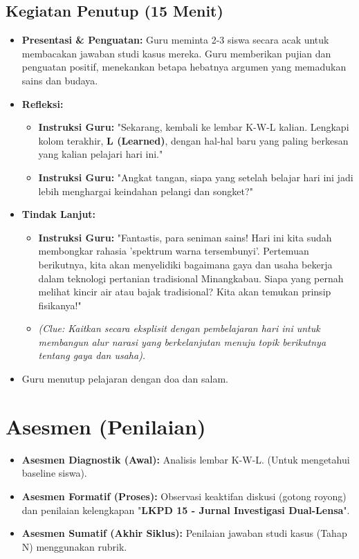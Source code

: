 \documentclass[12pt,a4paper]{article}
\begin{document}
\subsection{Kegiatan Penutup (15 Menit)}
\begin{itemize}
\item \textbf{Presentasi \& Penguatan:} Guru meminta 2-3 siswa secara acak untuk membacakan jawaban studi kasus mereka. Guru memberikan pujian dan penguatan positif, menekankan betapa hebatnya argumen yang memadukan sains dan budaya.
\item \textbf{Refleksi:}
    \begin{itemize}
    \item \textbf{Instruksi Guru:} "Sekarang, kembali ke lembar K-W-L kalian. Lengkapi kolom terakhir, \textbf{L (Learned)}, dengan hal-hal baru yang paling berkesan yang kalian pelajari hari ini."
    \item \textbf{Instruksi Guru:} "Angkat tangan, siapa yang setelah belajar hari ini jadi lebih menghargai keindahan pelangi dan songket?"
    \end{itemize}
\item \textbf{Tindak Lanjut:}
    \begin{itemize}
    \item \textbf{Instruksi Guru:} "Fantastis, para seniman sains! Hari ini kita sudah membongkar rahasia 'spektrum warna tersembunyi'. Pertemuan berikutnya, kita akan menyelidiki bagaimana gaya dan usaha bekerja dalam teknologi pertanian tradisional Minangkabau. Siapa yang pernah melihat kincir air atau bajak tradisional? Kita akan temukan prinsip fisikanya!"
    \item \textit{(Clue: Kaitkan secara eksplisit dengan pembelajaran hari ini untuk membangun alur narasi yang berkelanjutan menuju topik berikutnya tentang gaya dan usaha).}
    \end{itemize}
\item Guru menutup pelajaran dengan doa dan salam.
\end{itemize}

\section{Asesmen (Penilaian)}

\begin{itemize}
\item \textbf{Asesmen Diagnostik (Awal):} Analisis lembar K-W-L. (Untuk mengetahui baseline siswa).
\item \textbf{Asesmen Formatif (Proses):} Observasi keaktifan diskusi (gotong royong) dan penilaian kelengkapan "\textbf{LKPD 15 - Jurnal Investigasi Dual-Lensa}".
\item \textbf{Asesmen Sumatif (Akhir Siklus):} Penilaian jawaban studi kasus (Tahap N) menggunakan rubrik.
\end{itemize}
\end{document}
